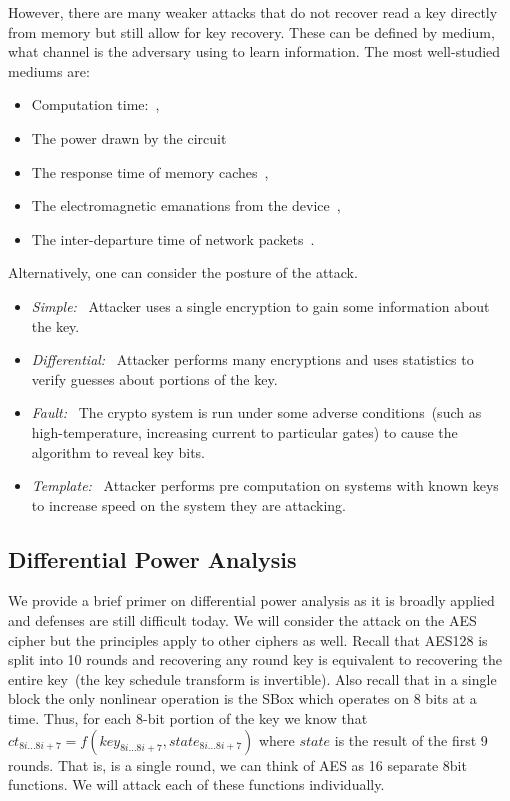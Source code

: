 \documentclass{article}
\begin{document}
However, there are many weaker attacks that do not recover read a key directly from memory but still allow for key recovery.  These can be defined by medium, what channel is the adversary using to learn information.  The most well-studied mediums are:
\begin{itemize}
\item Computation time:~\cite{kocherTiming}, 
\item The power drawn by the circuit~\cite{kocherDPA}
\item The response time of memory caches~\cite{Bernstein05cache-timingattacks, Tromer:2010fk}, 
\item The electromagnetic emanations from the device~\cite{DEMAConcrete,DEMASmartCards},
\item The inter-departure  time of network packets~\cite{voipAnalysis}.
\end{itemize}

Alternatively, one can consider the posture of the attack.
\begin{itemize}
\item \emph{Simple:}~\cite{kocherDPA} Attacker uses a single encryption to gain some information about the key.
\item \emph{Differential:}~\cite{kocherDPA} Attacker performs many encryptions and uses statistics to verify guesses about portions of the key.
\item \emph{Fault:}~\cite{bihamShamirFault} The crypto system is run under some adverse conditions~(such as high-temperature, increasing current to particular gates) to cause the algorithm to reveal key bits.
\item \emph{Template:}~\cite{chariTemplate} Attacker performs pre computation on systems with known keys to increase speed on the system they are attacking.
\end{itemize}

\subsection{Differential Power Analysis}
We provide a brief primer on differential power analysis as it is broadly applied and defenses are still difficult today.  We will consider the attack on the AES cipher but the principles apply to other ciphers as well.  Recall that AES128 is split into 10 rounds and recovering any round key is equivalent to recovering the entire key~(the key schedule transform is invertible).  Also recall that in a single block the only nonlinear operation is the SBox which operates on 8 bits at a time.  Thus, for each 8-bit portion of the key we know that $ct_{8i...8i+7} = f(key_{8i...8i+7}, state_{8i...8i+7})$ where $state$ is the result of the first 9 rounds.  That is, is a single round, we can think of AES as 16 separate 8bit functions.  We will attack each of these functions individually.
\end{document}
